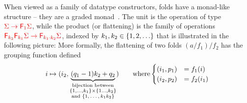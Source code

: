 When viewed as a family of datatype constructors,  folds have a monad-like structure -- they are a graded  monad~\cite[p. 518]{fujiShinyaMellies2016}. The unit is the operation 
of type ${\color{red}{\Sigma \to {\color{red}{\mathsf F_{1}}}\Sigma}}$, while  the product (or flattening) is the family of operations ${\color{red}{{\color{red}{\mathsf F_{k_2}}}{\color{red}{\mathsf F_{k_1}}}\Sigma \to {\color{red}{\mathsf F_{k_1 \cdot k_2}}}\Sigma}}$, indexed by $k_1,k_2 \in \{1,2,\ldots\}$ that is illustrated in the following picture:
More formally, the flattening of two folds $(a/{f_1})/{f_2}$ has the grouping function defined
\begin{align*}
i \mapsto (i_2, \underbrace{(q_1 -1)k_2 + q_2}_{\substack{\text{bijection between} \\ \{1,\ldots,k_1\} \times \{1\ldots,k_2\} \\ \text{and $\{1,\ldots,k_1k_2\}$}}}) \qquad \text{where} \begin{cases}
    (i_1,p_1) &= f_1(i)\\
    (i_2,p_2) &= f_2(i_1)
\end{cases}
\end{align*}



 
